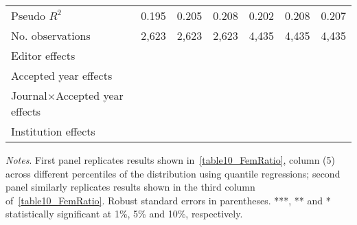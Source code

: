 \begin{table}[H]
\begin{threeparttable}
\begin{tabular}{p{3.78cm}S@{}S@{}S@{}S@{}S@{}S@{}}
            \midrule
            Pseudo \(R^2\)                &       0.195   &       0.205   &       0.208   &       0.202   &       0.208   &       0.207   \\
            No. observations              &       2,623   &       2,623   &       2,623   &       4,435   &       4,435   &       4,435   \\
            \midrule
            Editor effects       &           {}   &           {}   &           {}   &           {}   &           {}   &           {}   \\
            Accepted year effects         &           {}   &           {}   &           {}   &               &               &               \\
            Journal\(\times\)Accepted year effects&               &               &               &           {}   &           {}   &           {}   \\
            Institution effects           &           {}   &           {}   &           {}   &           {}   &           {}   &           {}   \\
            \bottomrule
        \end{tabular}
        \begin{tablenotes}
            \tiny
            \item \textit{Notes}. First panel replicates results shown in~\autoref{table10_FemRatio}, column (5) across different percentiles of the distribution using quantile regressions; second panel similarly replicates results shown in the third column of~\autoref{table10_FemRatio}. Robust standard errors in parentheses. ***, ** and * statistically significant at 1\%, 5\% and 10\%, respectively.
        \end{tablenotes}
    \end{threeparttable}
\end{table}